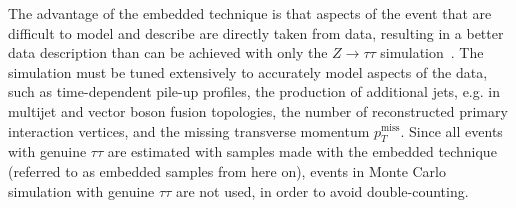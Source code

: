 The advantage of the embedded technique is that aspects of the event that are difficult to model and describe are directly taken from data, resulting in a better data description than can be achieved with only the $Z \rightarrow \tau\tau$ simulation~\cite{CMS-TAU-18-001}. The simulation must be tuned extensively to accurately model aspects of the data, such as time-dependent pile-up profiles, the production of additional jets, e.g. in multijet and vector boson fusion topologies, the number of reconstructed primary interaction vertices, and the missing transverse momentum $p_{T}^{\text{miss}}$. Since all events with genuine $\tau\tau$ are estimated with samples made with the embedded technique (referred to as embedded samples from here on), events in Monte Carlo simulation with genuine $\tau\tau$ are not used, in order to avoid double-counting.
